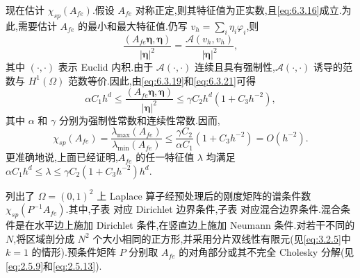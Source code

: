 现在估计 \(\chi_{sp}(A_{fe})\).假设 \(A_{fe}\) 对称正定,则其特征值为正实数,且\eqref{eq:6.3.16}成立.为此,需要估计 \(A_{fe}\) 的最小和最大特征值.仍写 \(v_h=\sum_i\eta_i\varphi_i\),则
\begin{equation}\label{eq:6.3.23}
  \frac{(A_{fe}\boldsymbol{\eta},\boldsymbol{\eta})}{|\boldsymbol{\eta}|^2}
    =\frac{\mathcal A(v_h,v_h)}{|\boldsymbol{\eta}|^2},
\end{equation}
其中 \((\cdot,\cdot)\) 表示 Euclid 内积.由于 \(\mathcal A(\cdot,\cdot)\) 连续且具有强制性,\(\mathcal A(\cdot,\cdot)\) 诱导的范数与 \(H^1(\Omega)\) 范数等价.因此,由\eqref{eq:6.3.19}和\eqref{eq:6.3.21}可得
\[
  \alpha C_1h^d\le\frac{(A_{fe}\boldsymbol{\eta},\boldsymbol{\eta})}{|\boldsymbol{\eta}|^2}
    \le\gamma C_2h^d(1+C_3h^{-2}),
\]
其中 \(\alpha\) 和 \(\gamma\) 分别为强制性常数和连续性常数.因而,
\[
  \chi_{sp}(A_{fe})=\frac{\lambda_{\max}(A_{fe})}{\lambda_{\min}(A_{fe})}
    \le\frac{\gamma C_2}{\alpha C_1}(1+C_3h^{-2})=O(h^{-2}).
\]
更准确地说,上面已经证明,\(A_{fe}\) 的任一特征值 \(\lambda\) 均满足 \(\alpha C_1h^d\le\lambda\le\gamma C_2(1+C_3h^{-2})h^d\).

列出了 \(\Omega=(0,1)^2\) 上 Laplace 算子经预处理后的刚度矩阵的谱条件数 \(\chi_{sp}(P^{-1}A_{fe})\).其中,子表  对应 Dirichlet 边界条件,子表  对应混合边界条件.混合条件是在水平边上施加 Dirichlet 条件,在竖直边上施加 Neumann 条件.对若干不同的 \(N\),将区域剖分成 \(N^2\) 个大小相同的正方形,并采用分片双线性有限元(见\eqref{eq:3.2.5}中 \(k=1\) 的情形).预条件矩阵 \(P\) 分别取 \(A_{fe}\) 的对角部分或其不完全 Cholesky 分解(见\eqref{eq:2.5.9}和\eqref{eq:2.5.13}).

